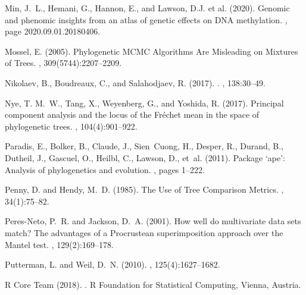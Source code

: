 \documentclass[a4]{article}
\newcommand{\+}[1]{\mathbf{#1}}
\begin{document}
\begin{thebibliography}{}
Min, J.~L., Hemani, G., Hannon, E., and {Lawson, D.J. et al.} (2020).
\newblock Genomic and phenomic insights from an atlas of genetic effects on
  {DNA} methylation.
, page 2020.09.01.20180406.

Mossel, E. (2005).
\newblock Phylogenetic {{MCMC Algorithms Are Misleading}} on {{Mixtures}} of
  {{Trees}}.
, 309(5744):2207--2209.

Nikolaev, B., Boudreaux, C., and Salahodjaev, R. (2017).
.
, 138:30--49.

Nye, T. M.~W., Tang, X., Weyenberg, G., and Yoshida, R. (2017).
\newblock Principal component analysis and the locus of the {{Fr\'echet}} mean
  in the space of phylogenetic trees.
, 104(4):901--922.

Paradis, E., Bolker, B., Claude, J., Sien~Cuong, H., Desper, R., Durand, B.,
  Dutheil, J., Gascuel, O., Heilbl, C., Lawson, D., et~al. (2011).
\newblock Package `ape': Analysis of phylogenetics and evolution.
,
  pages 1--222.

Penny, D. and Hendy, M.~D. (1985).
\newblock The {{Use}} of {{Tree Comparison Metrics}}.
, 34(1):75--82.

{Peres-Neto}, P.~R. and Jackson, D.~A. (2001).
\newblock How well do multivariate data sets match? {{The}} advantages of a
  {{Procrustean}} superimposition approach over the {{Mantel}} test.
, 129(2):169--178.

Putterman, L. and Weil, D.~N. (2010).
, 125(4):1627--1682.

{R Core Team} (2018).
.
\newblock R Foundation for Statistical Computing, Vienna, Austria.


\end{thebibliography}
\end{document}

